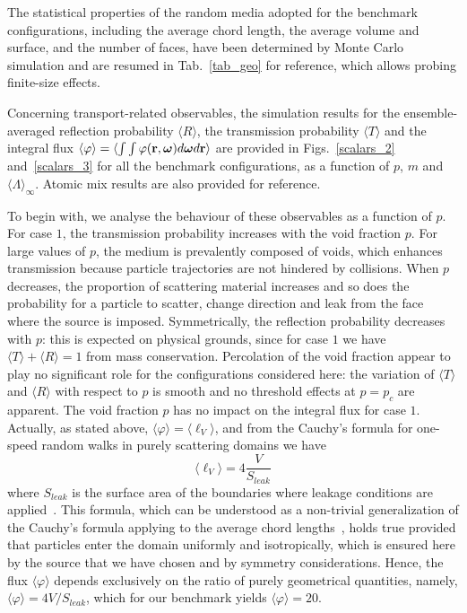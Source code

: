 \documentclass[final,authoryear,5p,times,twocolumn]{elsarticle}
\begin{document}
The statistical properties of the random media adopted for the benchmark configurations, including the average chord length, the average volume and surface, and the number of faces, have been determined by Monte Carlo simulation and are resumed in Tab.~\ref{tab_geo} for reference, which allows probing finite-size effects.

Concerning transport-related observables, the simulation results for the ensemble-averaged reflection probability $\langle R \rangle$, the transmission probability $\langle T \rangle$ and the integral flux $\langle \varphi  \rangle= \langle \int \int\varphi({\bf r}, {\boldsymbol \omega}) d {\boldsymbol \omega} d {\bf r}\rangle$ are provided in Figs.~\ref{scalars_2} and~\ref{scalars_3} for all the benchmark configurations, as a function of $p$, $m$ and ${\langle \Lambda \rangle}_{\infty}$. Atomic mix results are also provided for reference.

To begin with, we analyse the behaviour of these observables as a function of $p$. For case $1$, the transmission probability increases with the void fraction $p$. For large values of $p$, the medium is prevalently composed of voids, which enhances transmission because particle trajectories are not hindered by collisions. When $p$ decreases, the proportion of scattering material increases and so does the probability for a particle to scatter, change direction and leak from the face where the source is imposed. Symmetrically, the reflection probability decreases with $p$: this is expected on physical grounds, since for case $1$ we have $\langle T \rangle + \langle R \rangle = 1$ from mass conservation. Percolation of the void fraction appear to play no significant role for the configurations considered here: the variation of  $\langle T \rangle$ and $\langle R \rangle$ with respect to $p$ is smooth and no threshold effects at $p = p_c$ are apparent. The void fraction $p$ has no impact on the integral flux for case $1$. Actually, as stated above, $\langle \varphi \rangle = \langle \ell_V \rangle$, and from the Cauchy's formula for one-speed random walks in purely scattering domains we have
\begin{equation}
\langle \ell_V \rangle = 4\frac{V}{S_\textit{leak}}
\label{eq_cauchy_length}
\end{equation}
where $S_\textit{leak}$ is the surface area of the boundaries where leakage conditions are applied~\cite{blanco, zoia_cauchy_1, zoia_cauchy_2, zoia_cauchy_3}. This formula, which can be understood as a non-trivial generalization of the Cauchy's formula applying to the average chord lengths~\cite{blanco, zoia_cauchy_2}, holds true provided that particles enter the domain uniformly and isotropically, which is ensured here by the source that we have chosen and by symmetry considerations. Hence, the flux $\langle \varphi \rangle$ depends exclusively on the ratio of purely geometrical quantities, namely, $\langle \varphi \rangle = 4  V / S_\textit{leak}$, which for our benchmark yields $\langle \varphi \rangle = 20$.
\end{document}
